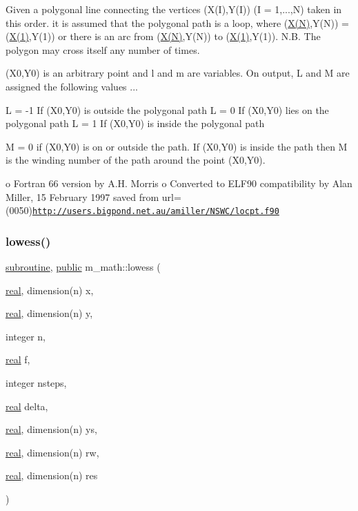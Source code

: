 Given a polygonal line connecting the vertices (X(\+I),Y(\+I)) (I = 1,...,N) taken in this order. it is assumed that the polygonal path is a loop, where (\hyperlink{intro__blas1_83_8txt_ab4d967e4f300b736e32886d090808e29}{X(\+N)},Y(\+N)) = (\hyperlink{intro__blas1_83_8txt_a7af7e1e13fc78374475d1be13503ee6e}{X(1)},Y(1)) or there is an arc from (\hyperlink{intro__blas1_83_8txt_ab4d967e4f300b736e32886d090808e29}{X(\+N)},Y(\+N)) to (\hyperlink{intro__blas1_83_8txt_a7af7e1e13fc78374475d1be13503ee6e}{X(1)},Y(1)). N.\+B. The polygon may cross itself any number of times.

(X0,Y0) is an arbitrary point and l and m are variables. On output, L and M are assigned the following values ...

L = -\/1 If (X0,Y0) is outside the polygonal path L = 0 If (X0,Y0) lies on the polygonal path L = 1 If (X0,Y0) is inside the polygonal path

M = 0 if (X0,Y0) is on or outside the path. If (X0,Y0) is inside the path then M is the winding number of the path around the point (X0,Y0).

o Fortran 66 version by A.\+H. Morris o Converted to E\+L\+F90 compatibility by Alan Miller, 15 February 1997 saved from url=(0050)\href{http://users.bigpond.net.au/amiller/NSWC/locpt.f90}{\tt http\+://users.\+bigpond.\+net.\+au/amiller/\+N\+S\+W\+C/locpt.\+f90} \mbox{\label{namespacem__math_a8e38b0954bb4c1f27985fb430912f281}} 
\subsubsection{\texorpdfstring{lowess()}{lowess()}}
{\footnotesize\ttfamily \hyperlink{M__stopwatch_83_8txt_acfbcff50169d691ff02d4a123ed70482}{subroutine}, \hyperlink{M__stopwatch_83_8txt_a2f74811300c361e53b430611a7d1769f}{public} m\+\_\+math\+::lowess (\begin{DoxyParamCaption}\item[{\hyperlink{read__watch_83_8txt_abdb62bde002f38ef75f810d3a905a823}{real}, dimension(n)}]{x,  }\item[{\hyperlink{read__watch_83_8txt_abdb62bde002f38ef75f810d3a905a823}{real}, dimension(n)}]{y,  }\item[{integer}]{n,  }\item[{\hyperlink{read__watch_83_8txt_abdb62bde002f38ef75f810d3a905a823}{real}}]{f,  }\item[{integer}]{nsteps,  }\item[{\hyperlink{read__watch_83_8txt_abdb62bde002f38ef75f810d3a905a823}{real}}]{delta,  }\item[{\hyperlink{read__watch_83_8txt_abdb62bde002f38ef75f810d3a905a823}{real}, dimension(n)}]{ys,  }\item[{\hyperlink{read__watch_83_8txt_abdb62bde002f38ef75f810d3a905a823}{real}, dimension(n)}]{rw,  }\item[{\hyperlink{read__watch_83_8txt_abdb62bde002f38ef75f810d3a905a823}{real}, dimension(n)}]{res }\end{DoxyParamCaption})}



